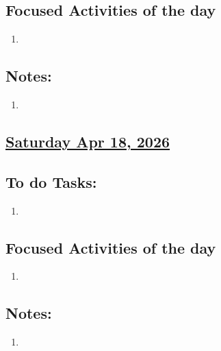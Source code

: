 \subsection*{Focused Activities of the day}
\begin{enumerate}[\ding{212}]  
    \item  
\end{enumerate}
\subsection*{Notes:}
\begin{enumerate}
    \item 
\end{enumerate}
\subsection*{\underline{Saturday Apr 18, 2026} }
\subsection*{To do Tasks:}
\begin{enumerate}
    \item 
\end{enumerate}
\subsection*{Focused Activities of the day}
\begin{enumerate}[\ding{212}]  
    \item 
\end{enumerate}
\subsection*{Notes:}
\begin{enumerate}
    \item 
\end{enumerate}
